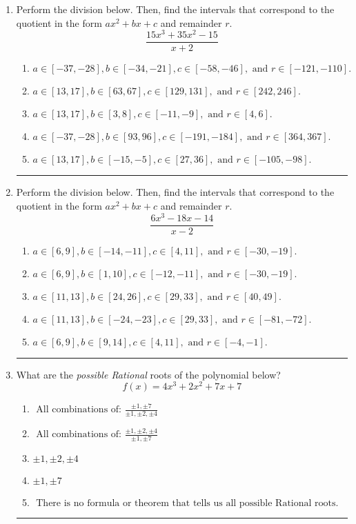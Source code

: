 \documentclass[14pt]{extbook}
\newcommand{\litem}[1]{\item#1\hspace*{-1cm}\rule{\textwidth}{0.4pt}}
\begin{document}
\begin{enumerate}
{\begin{enumerate}[label=\Alph*.]
\end{enumerate} }
\litem{
Perform the division below. Then, find the intervals that correspond to the quotient in the form $ax^2+bx+c$ and remainder $r$.\[ \frac{15x^{3} +35 x^{2} -15}{x + 2} \]\begin{enumerate}[label=\Alph*.]
\item \( a \in [-37, -28], b \in [-34, -21], c \in [-58, -46], \text{ and } r \in [-121, -110]. \)
\item \( a \in [13, 17], b \in [63, 67], c \in [129, 131], \text{ and } r \in [242, 246]. \)
\item \( a \in [13, 17], b \in [3, 8], c \in [-11, -9], \text{ and } r \in [4, 6]. \)
\item \( a \in [-37, -28], b \in [93, 96], c \in [-191, -184], \text{ and } r \in [364, 367]. \)
\item \( a \in [13, 17], b \in [-15, -5], c \in [27, 36], \text{ and } r \in [-105, -98]. \)

\end{enumerate} }
\litem{
Perform the division below. Then, find the intervals that correspond to the quotient in the form $ax^2+bx+c$ and remainder $r$.\[ \frac{6x^{3} -18 x -14}{x -2} \]\begin{enumerate}[label=\Alph*.]
\item \( a \in [6, 9], b \in [-14, -11], c \in [4, 11], \text{ and } r \in [-30, -19]. \)
\item \( a \in [6, 9], b \in [1, 10], c \in [-12, -11], \text{ and } r \in [-30, -19]. \)
\item \( a \in [11, 13], b \in [24, 26], c \in [29, 33], \text{ and } r \in [40, 49]. \)
\item \( a \in [11, 13], b \in [-24, -23], c \in [29, 33], \text{ and } r \in [-81, -72]. \)
\item \( a \in [6, 9], b \in [9, 14], c \in [4, 11], \text{ and } r \in [-4, -1]. \)

\end{enumerate} }
\litem{
What are the \textit{possible Rational} roots of the polynomial below?\[ f(x) = 4x^{3} +2 x^{2} +7 x + 7 \]\begin{enumerate}[label=\Alph*.]
\item \( \text{ All combinations of: }\frac{\pm 1,\pm 7}{\pm 1,\pm 2,\pm 4} \)
\item \( \text{ All combinations of: }\frac{\pm 1,\pm 2,\pm 4}{\pm 1,\pm 7} \)
\item \( \pm 1,\pm 2,\pm 4 \)
\item \( \pm 1,\pm 7 \)
\item \( \text{ There is no formula or theorem that tells us all possible Rational roots.} \)


\end{enumerate}}
\end{enumerate}
\end{document}
